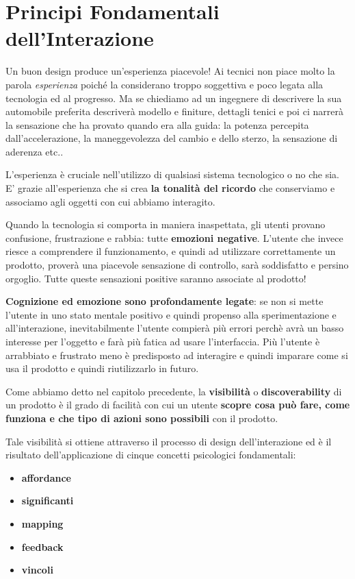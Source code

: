 \chapter{Principi Fondamentali dell'Interazione}
Un buon design produce un'esperienza piacevole! Ai tecnici non piace molto la parola \textit{esperienza} poiché la considerano troppo soggettiva e poco legata alla tecnologia ed al progresso. Ma se chiediamo ad un ingegnere di descrivere la sua automobile preferita descriverà modello e finiture, dettagli tenici e poi ci narrerà la sensazione che ha provato quando era alla guida: la potenza percepita dall'accelerazione, la maneggevolezza del cambio e dello sterzo, la sensazione di aderenza etc..

L'esperienza è cruciale nell'utilizzo di qualsiasi sistema tecnologico o no che sia. E' grazie all'esperienza che si crea \textbf{la tonalità del ricordo} che conserviamo e associamo agli oggetti con cui abbiamo interagito.

Quando la tecnologia si comporta in maniera inaspettata, gli utenti provano confusione, frustrazione e rabbia: tutte \textbf{emozioni negative}. L'utente che invece riesce a comprendere il funzionamento, e quindi ad utilizzare correttamente un prodotto, proverà una piacevole sensazione di controllo, sarà soddisfatto e persino orgoglio. Tutte queste sensazioni positive saranno associate al prodotto!

\textbf{Cognizione ed emozione sono profondamente legate}: se non si mette l'utente in uno stato mentale positivo e quindi propenso alla sperimentazione e all'interazione, inevitabilmente l'utente compierà più errori perchè avrà un basso interesse per l'oggetto e farà più fatica ad usare l'interfaccia. Più l'utente è arrabbiato e frustrato meno è predisposto ad interagire e quindi imparare come si usa il prodotto e quindi riutilizzarlo in futuro.

Come abbiamo detto nel capitolo precedente, la \textbf{visibilità} o \textbf{discoverability} di un prodotto è il grado di facilità con cui un utente \textbf{scopre cosa può fare, come funziona e che tipo di azioni sono possibili} con il prodotto. 

Tale visibilità si ottiene attraverso il processo di design dell'interazione ed è il risultato dell'applicazione di cinque concetti psicologici fondamentali: 

\begin{itemize}
    \item \textbf{affordance}
    \item \textbf{significanti}
    \item \textbf{mapping} 
    \item \textbf{feedback}
    \item \textbf{vincoli}
\end{itemize}

